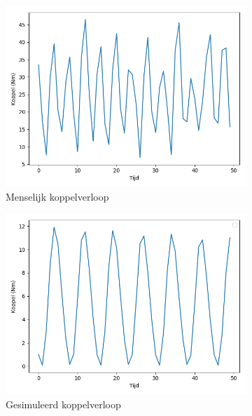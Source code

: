 \begin{figure}[t!]
\centering
\begin{subfigure}{.5\textwidth}
  \centering
  \includegraphics[width=\linewidth]{images/menselijkkoppel.png}
  \caption{Menselijk koppelverloop}
  \label{fig:menselijkkoppelverloop}
\end{subfigure}%
\begin{subfigure}{.5\textwidth}
  \centering
  \includegraphics[width=\linewidth]{images/gesimuleerdekoppel.png}
  \caption{Gesimuleerd koppelverloop}
  \label{fig:gesimuleerdkoppelverloop}
\end{subfigure}
\begin{subfigure}{.5\textwidth}
  \centering

\end{subfigure}
\end{figure}

